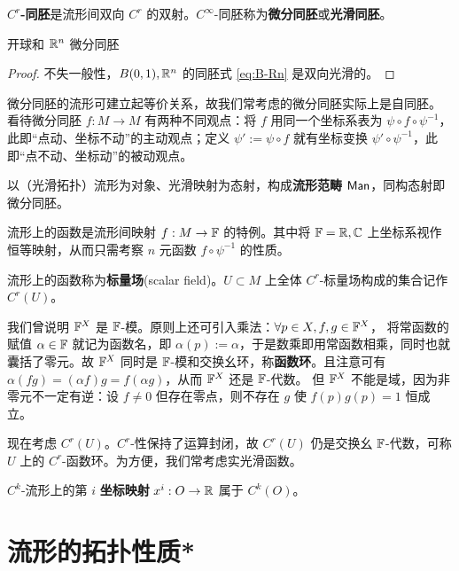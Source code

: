 \begin{definition}
    \textbf{$C^r$-同胚}是流形间双向 $C^r$ 的双射。$C^\infty$-同胚称为\textbf{微分同胚}或\textbf{光滑同胚}。
\end{definition}

\begin{theorem}
    开球和 $\mathbb{R}^n$ 微分同胚
\end{theorem}
\begin{proof}
    不失一般性，$B(0,1),\mathbb{R}^n$ 的同胚式 \eqref{eq:B-Rn} 是双向光滑的。
\end{proof}

微分同胚的流形可建立起等价关系，故我们常考虑的微分同胚实际上是自同胚。
看待微分同胚 $f:M\to M$ 有两种不同观点：将 $f$ 用同一个坐标系表为 $\psi\circ f\circ \psi^{-1}$，此即“点动、坐标不动”的主动观点；定义 $\psi':=\psi\circ f$ 就有坐标变换 $\psi' \circ\psi^{-1}$，此即“点不动、坐标动”的被动观点。

以（光滑拓扑）流形为对象、光滑映射为态射，构成\textbf{流形范畴} $\mathsf{Man}$，同构态射即微分同胚。


\begin{example}
    流形上的函数是流形间映射 $f:M\to\mathbb{F}$ 的特例。其中将 $\mathbb{F}=\mathbb{R},\mathbb{C}$ 上坐标系视作恒等映射，从而只需考察 $n$ 元函数 $f\circ\psi^{-1}$ 的性质。
\end{example}

\begin{definition}
    流形上的函数称为\textbf{标量场}(scalar field)。$U\subset M$ 上全体 $C^r$-标量场构成的集合记作 $C^r(U)$。
\end{definition}

我们曾说明 $\mathbb{F}^X$ 是 $\mathbb{F}$-模。原则上还可引入乘法：$\forall p\in X,f,g\in \mathbb{F}^X$，
将常函数的赋值 $\alpha\in\mathbb{F}$ 就记为函数名，即 $\alpha(p):=\alpha$，于是数乘即用常函数相乘，同时也就囊括了零元。故 $\mathbb{F}^X$ 同时是 $\mathbb{F}$-模和交换幺环，称\textbf{函数环}。且注意可有 $\alpha(fg)=(\alpha f) g=f(\alpha g)$，从而 $\mathbb{F}^X$ 还是 $\mathbb{F}$-代数。
但 $\mathbb{F}^X$ 不能是域，因为非零元不一定有逆：设 $f\ne 0$ 但存在零点，则不存在 $g$ 使 $f(p)g(p)=1$ 恒成立。

现在考虑 $C^r(U)$。$C^r$-性保持了运算封闭，故 $C^r(U)$ 仍是交换幺 $\mathbb{F}$-代数，可称 $U$ 上的 $C^r$-函数环。为方便，我们常考虑实光滑函数。

\begin{example}
    $C^k$-流形上的第 $i$ \textbf{坐标映射} $x^i:O\to\mathbb{R}$ 属于 $C^k(O)$。
\end{example}

\section{流形的拓扑性质*}

